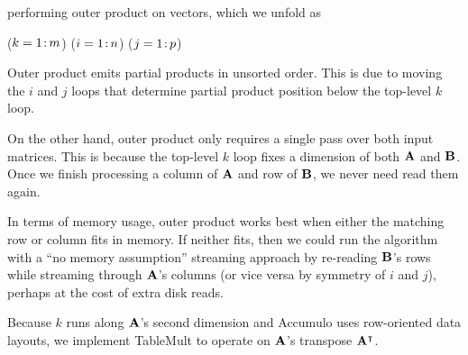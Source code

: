 \noindent %
performing outer %
product
on vectors, 
which we unfold as

\removelatexerror
\begin{algorithm}[H]
\vspace{\algspace}
\fore($k = 1\colon\! m$){
\fore($i = 1\colon\! n$){
\fore($j = 1\colon\! p$){
}}}
\vspace{\algspace}
\end{algorithm}

Outer product emits partial products in unsorted order.
This is due to moving the $i$ and $j$ loops
that determine partial product position
below the top-level $k$ loop.

On the other hand, outer product only requires a single pass over both input matrices.
This is because the top-level $k$ loop fixes a dimension of both $\mathbf{A}$ and $\mathbf{B}$.
Once we finish processing a column of $\mathbf{A}$ and row of $\mathbf{B}$,
we never need read them again.%

In terms of memory usage, outer product works best when either the matching row or column fits in memory.
If neither fits, then we could run the algorithm 
with a ``no memory assumption'' streaming approach
by re-reading $\mathbf{B}$'s rows while streaming through $\mathbf{A}$'s columns 
(or vice versa by symmetry of $i$ and $j$),
perhaps at the cost of extra disk reads.

Because $k$ runs along $\mathbf{A}$'s second dimension 
and Accumulo uses row-oriented data layouts, we implement 
TableMult to operate on $\mathbf{A}$'s transpose $\mathbf{A^{\intercal}}$.



